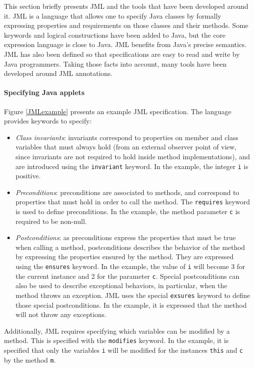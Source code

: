 \label{JavaModellingLanguage}
 This section briefly presents JML and the tools that have been
 developed around it.  JML \cite{Leavens-Baker-Ruby03} is a language that allows one to
 specify Java classes by formally expressing properties and
 requirements on those classes and their methods.  Some keywords and
 logical constructions have been added to Java, but the core
 expression language is close to Java.  JML benefits from Java's
 precise semantics.  JML has also been defined so that specifications
 are easy to read and write by Java programmers.  Taking those facts
 into account, many tools have been developed around JML annotations.

\paragraph{Specifying Java applets}
 Figure \ref{JMLexample} presents an example JML specification. The
 language provides keywords to specify:
\begin{itemize}
 \item \textit{Class invariants}: invariants correspond to properties
 on member and class variables that must always hold (from an external
 observer point of view, since invariants are not required to hold
 inside method implementations), and are introduced using the
 \texttt{invariant} keyword.
In the example, the integer \texttt{i} is positive.
 \item \textit{Preconditions}: preconditions are associated to methods, and correspond to properties that must hold in order to
call the method. The \texttt{requires} keyword is used to define
 preconditions. In the example, the method parameter \texttt{c} is
required to be non-null.
 \item \textit{Postconditions}: as preconditions express the properties that must be true when calling a
method, postconditions describes the behavior of the method by
 expressing the properties ensured by the method. They are expressed
 using the \texttt{ensures} keyword.
In the example, the value of \texttt{i} will become 3 for the current
instance and 2 for the parameter \texttt{c}.
 Special postconditions can also be used to describe exceptional behaviors, in particular, when
the method throws an exception. JML uses the special \texttt{exsures}
 keyword to define those special postconditions. In the example, it is
 expressed that the method will not throw any exceptions.
\end{itemize}

Additionally, JML requires specifying which variables can be modified
by a method. This is specified with the \texttt{modifies} keyword.
In the example, it is specified that only the variables
\texttt{i} will be modified for the instances \texttt{this} and
\texttt{c} by the method \texttt{m}.

